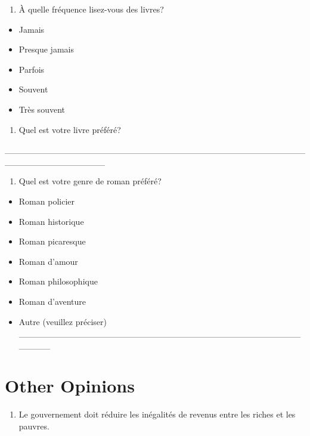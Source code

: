 \documentclass[
  letterpaper,
  DIV=11,
  numbers=noendperiod]{scrreprt}
\providecommand{\tightlist}{%
  \setlength{\itemsep}{0pt}\setlength{\parskip}{0pt}}\usepackage{longtable,booktabs,array}
\begin{document}
\begin{enumerate}
\def\labelenumi{\arabic{enumi}.}
\setcounter{enumi}{55}
\tightlist
\item
  À quelle fréquence lisez-vous des livres?
\end{enumerate}

\begin{itemize}
\tightlist
\item
  Jamais
\item
  Presque jamais
\item
  Parfois
\item
  Souvent
\item
  Très souvent
\end{itemize}

\begin{enumerate}
\def\labelenumi{\arabic{enumi}.}
\setcounter{enumi}{56}
\tightlist
\item
  Quel est votre livre préféré?
\end{enumerate}

\_\_\_\_\_\_\_\_\_\_\_\_\_\_\_\_\_\_\_\_\_\_\_\_\_\_\_\_\_\_\_\_\_\_\_\_\_\_\_\_\_\_\_\_\_\_\_\_\_\_\_\_\_\_\_\_\_\_\_\_\_\_\_\_

\begin{enumerate}
\def\labelenumi{\arabic{enumi}.}
\setcounter{enumi}{57}
\tightlist
\item
  Quel est votre genre de roman préféré?
\end{enumerate}

\begin{itemize}
\tightlist
\item
  Roman policier
\item
  Roman historique
\item
  Roman picaresque
\item
  Roman d'amour
\item
  Roman philosophique
\item
  Roman d'aventure
\item
  Autre (veuillez préciser)
  \_\_\_\_\_\_\_\_\_\_\_\_\_\_\_\_\_\_\_\_\_\_\_\_\_\_\_\_\_\_\_\_\_\_\_\_\_\_\_\_\_\_\_\_\_\_\_\_\_\_
\end{itemize}

\section{Other Opinions}\label{other-opinions}

\begin{enumerate}
\def\labelenumi{\arabic{enumi}.}
\setcounter{enumi}{58}
\tightlist
\item
  Le gouvernement doit réduire les inégalités de revenus entre les
  riches et les pauvres.
\end{enumerate}
\end{document}
